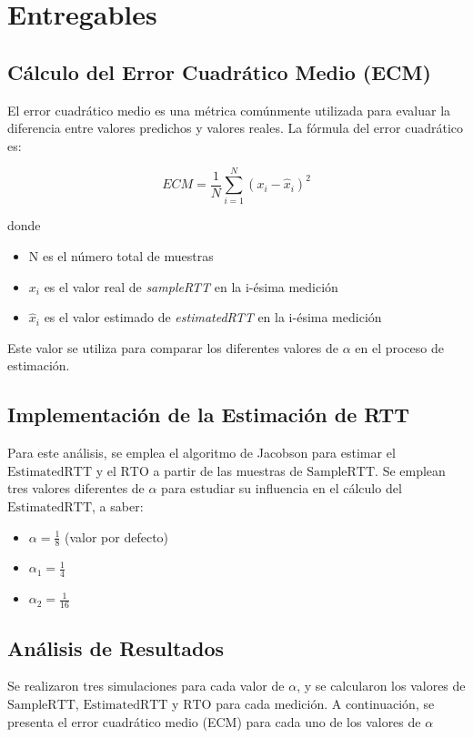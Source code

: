 \newpage
\section*{Entregables}

\subsection*{Cálculo del Error Cuadrático Medio (ECM)}
\noindent El error cuadr\'atico medio es una m\'etrica com\'unmente utilizada para evaluar la 
diferencia entre valores predichos y valores reales. La f\'ormula del error cuadr\'atico es:

$$ ECM = \frac{1}{N} \sum_{i = 1}^{N}(x_i-\hat{x}_i)^2 $$

donde 

\begin{itemize}
  \item N es el número total de muestras
  \item \(x_i\) es el valor real de \textit{sampleRTT} en la i-\'esima medici\'on
  \item \(\hat{x}_i\) es el valor estimado de \textit{estimatedRTT} en la i-\'esima medici\'on
\end{itemize}

\noindent Este valor se utiliza para comparar los diferentes valores de \( \alpha \) en el proceso de estimación.

\subsection*{Implementación de la Estimación de RTT}
\noindent Para este análisis, se emplea el algoritmo de Jacobson para estimar el \( \text{EstimatedRTT} \) 
y el \( \text{RTO} \) a partir de las muestras de \( \text{SampleRTT} \). Se emplean tres valores 
diferentes de \( \alpha \) para estudiar su influencia en el cálculo del \( \text{EstimatedRTT} \),
a saber:
\begin{itemize}
    \item \( \alpha = \frac{1}{8} \) (valor por defecto)
    \item \( \alpha_1 = \frac{1}{4} \)
    \item \( \alpha_2 = \frac{1}{16} \)
\end{itemize}

\subsection*{Análisis de Resultados}
\noindent Se realizaron tres simulaciones para cada valor de \( \alpha \), y se calcularon los valores 
de \( \text{SampleRTT} \), \( \text{EstimatedRTT} \) y \( \text{RTO} \) para cada medición. A 
continuación, se presenta el error cuadrático medio (ECM) para cada uno de los valores de \( \alpha \)

